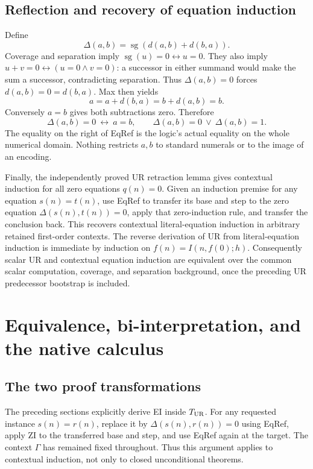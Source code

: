\documentclass[11pt]{article}
\begin{document}
\subsection{Reflection and recovery of equation induction}

Define
\[
                       \Delta(a,b)=\operatorname{sg}(d(a,b)+d(b,a)).
\]
Coverage and separation imply $\operatorname{sg}(u)=0\leftrightarrow u=0$.
They also imply $u+v=0\leftrightarrow(u=0\land v=0)$: a successor
in either summand would make the sum a successor, contradicting separation.
Thus $\Delta(a,b)=0$ forces $d(a,b)=0=d(b,a)$. Max then yields
\[
               a=a+d(b,a)=b+d(a,b)=b.
\]
Conversely $a=b$ gives both subtractions zero. Therefore
\[
 \boxed{\quad \Delta(a,b)=0\ \longleftrightarrow\ a=b,\qquad
                  \Delta(a,b)=0\ \lor\ \Delta(a,b)=1.\quad}
 \tag{EqRef}
\]
The equality on the right of EqRef is the logic's actual equality on
the whole numerical domain. Nothing restricts $a,b$ to standard numerals
or to the image of an encoding.

Finally, the independently proved UR retraction lemma gives contextual
induction for all zero equations $q(n)=0$. Given an induction premise
for any equation $s(n)=t(n)$, use EqRef to transfer its base and step
to the zero equation $\Delta(s(n),t(n))=0$, apply that zero-induction
rule, and transfer the conclusion back. This recovers contextual
literal-equation induction in arbitrary retained first-order contexts.
The reverse derivation of UR from literal-equation induction is immediate
by induction on $f(n)=I(n,f(0);h)$. Consequently scalar UR and contextual
equation induction are equivalent over the common scalar computation,
coverage, and separation background, once the preceding UR predecessor
bootstrap is included.



\section{Equivalence, bi-interpretation, and the native calculus}
\label{sec:ur-equivalence-finish}

\subsection{The two proof transformations}
The preceding sections explicitly derive EI inside $T_{\rm UR}$.
For any requested instance $s(n)=r(n)$, replace it by
$\Delta(s(n),r(n))=0$ using EqRef, apply ZI to the transferred base
and step, and use EqRef again at the target.  The context $\Gamma$
has remained fixed throughout.  Thus this argument applies to
contextual induction, not only to closed unconditional theorems.
\end{document}

